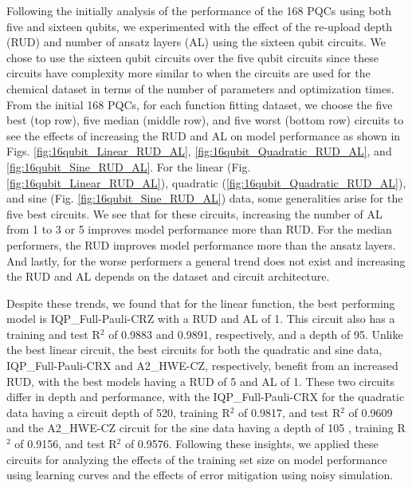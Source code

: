 \documentclass[journal=jacsat,manuscript=article]{achemso}
\begin{document}
Following the initially analysis of the performance of the 168 PQCs using both five and sixteen qubits, we experimented with the effect of the re-upload depth (RUD) and number of ansatz layers (AL) using the sixteen qubit circuits.
We chose to use the sixteen qubit circuits over the five qubit circuits since these circuits have complexity more similar to when the circuits are used for the chemical dataset in terms of the number of parameters and optimization times.
From the initial 168 PQCs, for each function fitting dataset, we choose the five best (top row), five median (middle row), and five worst (bottom row) circuits to see the effects of increasing the RUD and AL on model performance as shown in Figs. \ref{fig:16qubit_Linear_RUD_AL}, \ref{fig:16qubit_Quadratic_RUD_AL}, and  \ref{fig:16qubit_Sine_RUD_AL}.
For the linear (Fig. \ref{fig:16qubit_Linear_RUD_AL}), quadratic (\ref{fig:16qubit_Quadratic_RUD_AL}), and sine (Fig. \ref{fig:16qubit_Sine_RUD_AL}) data, some generalities arise for the five best circuits. 
We see that for these circuits, increasing the number of AL from 1 to 3 or 5 improves model performance more than RUD.
For the median performers, the RUD improves model performance more than the ansatz layers.
And lastly, for the worse performers a general trend does not exist and increasing the RUD and AL depends on the dataset and circuit architecture. 


Despite these trends, we found that for the linear function, the best performing model is IQP\_Full-Pauli-CRZ  with a RUD and AL of 1.
This circuit also has a training and test R$^{2}$ of 0.9883 and 0.9891, respectively, and a depth of 95.
Unlike the best linear circuit, the best circuits for both the quadratic and sine data, IQP\_Full-Pauli-CRX	 and A2\_HWE-CZ, respectively,  benefit from an increased RUD, with the best models having a RUD of 5 and AL of 1.
These two circuits differ in depth and performance, with the IQP\_Full-Pauli-CRX for the quadratic data having a circuit depth of 520, training R$^{2}$ of 0.9817, and test R$^{2}$ of 0.9609 and the A2\_HWE-CZ circuit for the sine data having a depth of 105 , training R$^{2}$ of 0.9156, and test R$^{2}$ of 0.9576.
Following these insights, we applied these circuits for analyzing the effects of the training set size on model performance using learning curves and the effects of error mitigation using noisy simulation.
\end{document}
